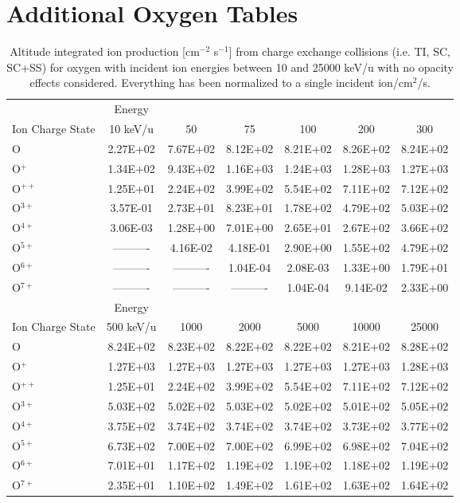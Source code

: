 \section{Additional Oxygen Tables}
\label{app:Oxy}

\begin{table}[ht]
    \centering
    \caption{Altitude integrated ion production [cm$^{-2}$ s$^{-1}$] from charge exchange collisions (i.e. TI, SC, SC+SS) for oxygen with incident ion energies between 10 and 25000 keV/u with no opacity effects considered. Everything has been normalized to a single incident ion/cm$^2$/s.}
    \begin{tabular}{l|c|c|c|c|c|c}
    \hline
    & Energy & & & & & \\
    Ion Charge State & 10 keV/u & 50 & 75 & 100 & 200 & 300 \\
    \hline
    O & 2.27E+02 & 7.67E+02 & 8.12E+02 & 8.21E+02 & 8.26E+02 & 8.24E+02 \\
    O$^+$ & 1.34E+02 & 9.43E+02 & 1.16E+03 & 1.24E+03 & 1.28E+03 & 1.27E+03 \\
    O$^{++}$ & 1.25E+01 & 2.24E+02 & 3.99E+02 & 5.54E+02 & 7.11E+02 & 7.12E+02 \\
    O$^{3+}$ & 3.57E-01 & 2.73E+01 & 8.23E+01 & 1.78E+02 & 4.79E+02 & 5.03E+02 \\
    O$^{4+}$ & 3.06E-03 & 1.28E+00 & 7.01E+00 & 2.65E+01 & 2.67E+02 & 3.66E+02 \\
    O$^{5+}$ & ---------- & 4.16E-02 & 4.18E-01 & 2.90E+00 & 1.55E+02 & 4.79E+02 \\
    O$^{6+}$ & ---------- & ---------- & 1.04E-04 & 2.08E-03 & 1.33E+00 & 1.79E+01 \\
    O$^{7+}$ & ---------- & ---------- & ---------- & 1.04E-04 & 9.14E-02 & 2.33E+00 \\
    \hline
    \hline
    & Energy & & & & & \\
    Ion Charge State & 500 keV/u & 1000 & 2000 & 5000 & 10000 & 25000 \\
    \hline
    O & 8.24E+02 & 8.23E+02 & 8.22E+02 & 8.22E+02 & 8.21E+02 & 8.28E+02 \\
    O$^+$ & 1.27E+03 & 1.27E+03 & 1.27E+03 & 1.27E+03 & 1.27E+03 & 1.28E+03 \\
    O$^{++}$ & 1.25E+01 & 2.24E+02 & 3.99E+02 & 5.54E+02 & 7.11E+02 & 7.12E+02 \\
    O$^{3+}$ & 5.03E+02 & 5.02E+02 & 5.03E+02 & 5.02E+02 & 5.01E+02 & 5.05E+02 \\
    O$^{4+}$ & 3.75E+02 & 3.74E+02 & 3.74E+02 & 3.74E+02 & 3.73E+02 & 3.77E+02 \\
    O$^{5+}$ & 6.73E+02 & 7.00E+02 & 7.00E+02 & 6.99E+02 & 6.98E+02 & 7.04E+02 \\
    O$^{6+}$ & 7.01E+01 & 1.17E+02 & 1.19E+02 & 1.19E+02 & 1.18E+02 & 1.19E+02 \\
    O$^{7+}$ & 2.35E+01 & 1.10E+02 & 1.49E+02 & 1.61E+02 & 1.63E+02 & 1.64E+02 \\
    \hline
    \end{tabular}
    \label{tab:OxyCXProd}
\end{table}

